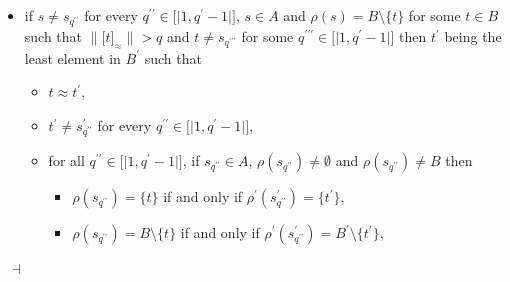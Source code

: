\documentclass[draft]{article}
\newenvironment{proof}{{\bf Proof:}}{~$\dashv$\\}
\def\lsem{{\lbrack\mid}}
\def\rsem{{\mid\rbrack}}
\begin{document}
\begin{proof}
\begin{itemize}
%
%
\begin{itemize}
%
%
\item $t{\approx}t^{\prime}$,
%
%
\item $t^{\prime}{\not=}s^{\prime}_{q^{\prime\prime}}$ for every $q^{\prime\prime}{\in}\lsem1,q^{\prime}{-}1\rsem$,
%
%
\item for all $q^{\prime\prime}{\in}\lsem1,q^{\prime}{-}1\rsem$, if $s_{q^{\prime\prime}}{\in}A$, $\rho(s_{q^{\prime\prime}}){\not=}\emptyset$ and $\rho(s_{q^{\prime\prime}}){\not=}B$ then
%
%
\begin{itemize}
%
%
\item $\rho(s_{q^{\prime\prime}}){=}\{t\}$ if and only if $\rho^{\prime}(s^{\prime}_{q^{\prime\prime}}){=}\{t^{\prime}\}$,
%
%
\item $\rho(s_{q^{\prime\prime}}){=}B{\setminus}\{t\}$ if and only if $\rho^{\prime}(s^{\prime}_{q^{\prime\prime}}){=}B^{\prime}{\setminus}\{t^{\prime}\}$,
%
%
\end{itemize}
%
%
\end{itemize}
%
%
the second player picks the least element in ${\rho^{\prime}}^{{-}1}(\{t^{\prime}\}){\setminus}\{s^{\prime}_{1},\ldots,s^{\prime}_{q^{\prime}{-}1}\}$,
%
%
\item if $s{\not=}s_{q^{\prime\prime}}$ for every $q^{\prime\prime}{\in}\lsem1,q^{\prime}{-}1\rsem$, $s{\in}A$ and $\rho(s){=}B{\setminus}\{t\}$ for some $t{\in}B$ such that ${\parallel}\lbrack t\rbrack_{\approx}{\parallel}{>}q$ and $t{\not=}s_{q^{\prime\prime\prime}}$ for some $q^{\prime\prime\prime}{\in}\lsem1,q^{\prime}{-}1\rsem$ then $t^{\prime}$ being the least element in $B^{\prime}$ such that
%
%
\begin{itemize}
%
%
\item $t{\approx}t^{\prime}$,
%
%
\item $t^{\prime}{\not=}s^{\prime}_{q^{\prime\prime}}$ for every $q^{\prime\prime}{\in}\lsem1,q^{\prime}{-}1\rsem$,
%
%
\item for all $q^{\prime\prime}{\in}\lsem1,q^{\prime}{-}1\rsem$, if $s_{q^{\prime\prime}}{\in}A$, $\rho(s_{q^{\prime\prime}}){\not=}\emptyset$ and $\rho(s_{q^{\prime\prime}}){\not=}B$ then
%
%
\begin{itemize}
%
%
\item $\rho(s_{q^{\prime\prime}}){=}\{t\}$ if and only if $\rho^{\prime}(s^{\prime}_{q^{\prime\prime}}){=}\{t^{\prime}\}$,
%
%
\item $\rho(s_{q^{\prime\prime}}){=}B{\setminus}\{t\}$ if and only if $\rho^{\prime}(s^{\prime}_{q^{\prime\prime}}){=}B^{\prime}{\setminus}\{t^{\prime}\}$,

\end{itemize}
\end{itemize}
\end{itemize}
\end{proof}
\end{document}
